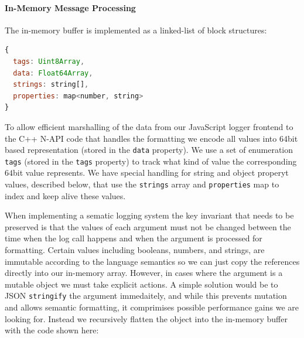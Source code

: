 \paragraph{In-Memory Message Processing}
\noindent
The in-memory buffer is implemented as a linked-list of block structures:
\begin{lstlisting}[language=JavaScript,basicstyle=\scriptsize]
{
  tags: Uint8Array,
  data: Float64Array,
  strings: string[],
  properties: map<number, string>
}
\end{lstlisting}

To allow efficient marshalling of the data from our JavaScript logger frontend 
to the C++ N-API code that handles the formatting we encode all values into 
$64$bit based representation (stored in the \texttt{data} property). We use a set 
of enumeration \texttt{tags} (stored in the \texttt{tags} property) to track 
what kind of value the corresponding $64$bit value represents. We have special 
handling for string and object properyt values, described below, that use the 
\texttt{strings} array and \texttt{properties} map to index and keep alive these values.

When implementing a sematic logging system the key invariant that needs to be 
preserved is that the values of each argument must not be changed between the 
time when the log call happens and when the argument is processed for 
formatting. Certain values including booleans, numbers, and strings, are 
immutable according to the language semantics so we can just copy the 
references directly into our in-memory array. However, in cases where the 
argument is a mutable object we must take explicit actions. A simple solution 
would be to JSON \texttt{stringify} the argument immedaitely, and while this 
prevents mutation and allows semantic formatting, it comprimises possible 
performance gains we are looking for. Instead we recursively flatten the object 
into the in-memory buffer with the code shown here:



